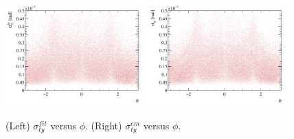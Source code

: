 %
%
\begin{figure}[h!]
\centering
\includegraphics[width=0.48\textwidth]{figs/ety-phi-fit.pdf}
\includegraphics[width=0.48\textwidth]{figs/ety-phi-em.pdf}
\caption{(Left) $\sigma^{fit}_{ty}$ versus $\phi$. (Right)
  $\sigma^{em}_{ty}$ versus $\phi$.}
\label{fig:emtyphi}
\end{figure}
%


\clearpage